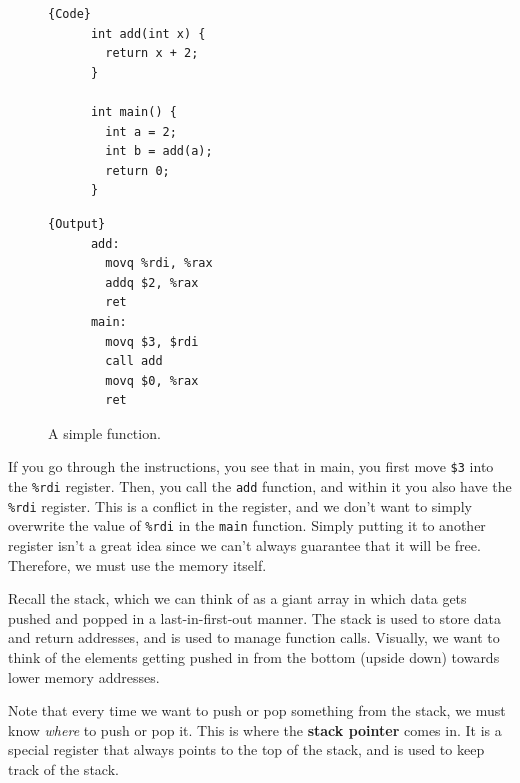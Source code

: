 \documentclass{article}
\begin{document}
  \begin{figure}[H]
    \centering 
    \noindent\begin{minipage}{.5\textwidth}
    \begin{lstlisting}[]{Code}
      int add(int x) {
        return x + 2; 
      }

      int main() {
        int a = 2; 
        int b = add(a); 
        return 0; 
      }
    \end{lstlisting}
    \end{minipage}
    \hfill
    \begin{minipage}{.49\textwidth}
    \begin{lstlisting}[]{Output}
      add: 
        movq %rdi, %rax 
        addq $2, %rax 
        ret 
      main:
        movq $3, $rdi 
        call add 
        movq $0, %rax 
        ret 
    \end{lstlisting}
    \end{minipage}
    \caption{A simple function. } 
    \label{fig:stack_example}
  \end{figure}

  If you go through the instructions, you see that in main, you first move \texttt{\$3} into the \texttt{\%rdi} register. Then, you call the \texttt{add} function, and within it you also have the \texttt{\%rdi} register. This is a conflict in the register, and we don't want to simply overwrite the value of \texttt{\%rdi} in the \texttt{main} function. Simply putting it to another register isn't a great idea since we can't always guarantee that it will be free. Therefore, we must use the memory itself. 

  Recall the stack, which we can think of as a giant array in which data gets pushed and popped in a last-in-first-out manner. The stack is used to store data and return addresses, and is used to manage function calls. Visually, we want to think of the elements getting pushed in from the bottom (upside down) towards lower memory addresses. 

  \begin{definition}
    Note that every time we want to push or pop something from the stack, we must know \textit{where} to push or pop it. This is where the \textbf{stack pointer} comes in. It is a special register that always points to the top of the stack, and is used to keep track of the stack.
  \end{definition}
\end{document}
